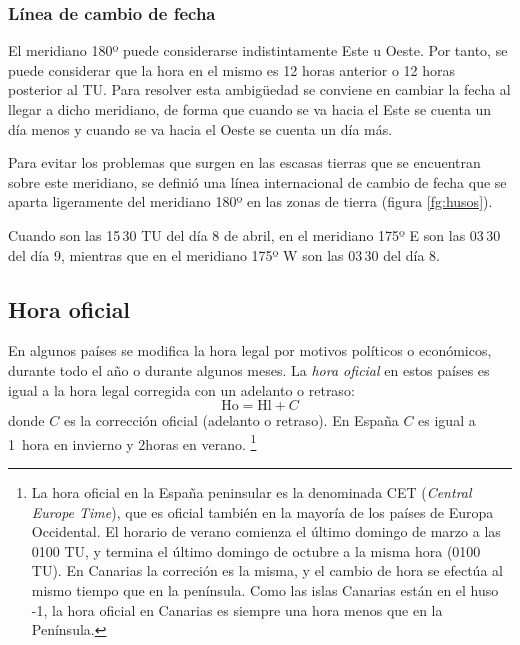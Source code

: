 \subsubsection{Línea de cambio de fecha}


El meridiano 180º puede considerarse indistintamente Este u Oeste. Por tanto, se puede considerar que la hora en el mismo es 12 horas anterior o 12 horas posterior al TU. Para resolver esta ambigüedad se conviene en cambiar la fecha al llegar a dicho meridiano, de forma que cuando se va hacia el Este se cuenta un día menos y cuando se va hacia el Oeste 
se cuenta un día más. 

Para evitar los problemas que surgen en las escasas tierras que se encuentran sobre este meridiano, se definió una línea internacional de cambio de fecha que se aparta ligeramente del meridiano 180º en las zonas de tierra (figura \ref{fg:husos}). 

\begin{ejemplo}
Cuando son las 15\,30 TU del día 8 de abril, en el meridiano 175º E son las 03\,30 del
día 9, mientras que en el meridiano 175º W son las 03\,30 del día 8. 
\end{ejemplo}

\subsection{Hora oficial}


En algunos países se modifica la hora legal por motivos políticos o económicos, durante todo el año o durante algunos meses. La \emph{hora oficial} en estos países es igual a la hora legal corregida con un adelanto o retraso: 
\begin{equation}
\mathrm{Ho} = \mathrm{Hl} + C
\end{equation}
donde $C$ es la corrección oficial (adelanto o retraso). En España $C$ es igual a 1~hora en invierno
 y 2horas en verano.%
\footnote{La hora oficial en la España peninsular es la denominada CET (\emph{Central Europe Time}), que es oficial también en la mayoría de los países de Europa Occidental. El horario de verano comienza el último domingo de marzo a las 0100 TU, y termina el último domingo de octubre a la misma hora (0100 TU). En Canarias la correción es la misma, y el cambio de hora se efectúa al mismo tiempo que en la península. Como las islas Canarias están en el huso -1, la hora oficial en Canarias es siempre una hora menos que en la Península.}

